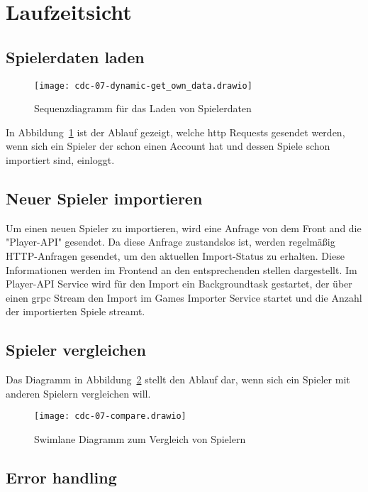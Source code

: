 \section{Laufzeitsicht}
\subsection{Spielerdaten laden}
\begin{figure}
    \centering
    \texttt{[image: cdc-07-dynamic-get\_own\_data.drawio]}
    \caption{Sequenzdiagramm für das Laden von Spielerdaten}
    \label{fig:load-data}
\end{figure}

In Abbildung~\ref{fig:load-data} ist der Ablauf gezeigt, welche http Requests gesendet werden, wenn sich ein Spieler
der schon einen Account hat und dessen Spiele schon importiert sind, einloggt.


\subsection{Neuer Spieler importieren}

Um einen neuen Spieler zu importieren, wird eine Anfrage von dem Front and die "Player-API" gesendet.
Da diese Anfrage zustandslos ist, werden regelmäßig HTTP-Anfragen gesendet, um den aktuellen Import-Status
zu erhalten.
Diese Informationen werden im Frontend an den entsprechenden stellen dargestellt.
Im Player-API Service wird für den Import ein Backgroundtask gestartet, der über einen grpc Stream den Import im
Games Importer Service startet und die Anzahl der importierten Spiele streamt.


\subsection{Spieler vergleichen}

Das Diagramm in Abbildung~\ref{fig:compare-diagram} stellt den Ablauf dar, wenn sich ein Spieler mit anderen Spielern vergleichen will.
\begin{figure}
    \centering
    \texttt{[image: cdc-07-compare.drawio]}
    \caption{Swimlane Diagramm zum Vergleich von Spielern}
    \label{fig:compare-diagram}
\end{figure}


\subsection{Error handling}
